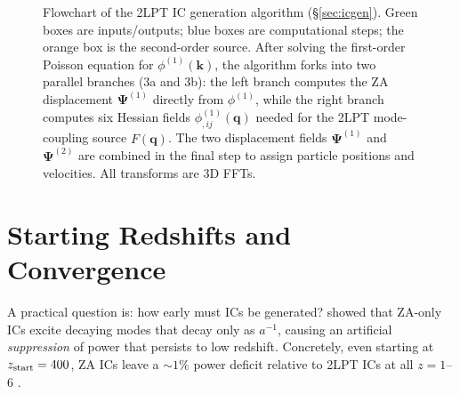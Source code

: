 \documentclass[12pt]{article}
\newcommand{\bq}{\mathbf{q}}
\newcommand{\bk}{\mathbf{k}}
\newcommand{\bPsi}{\boldsymbol{\Psi}}
\begin{document}
\begin{figure}[!t]
\caption{Flowchart of the 2LPT IC generation algorithm
(\S\ref{sec:icgen}).  Green boxes are inputs/outputs; blue boxes are
computational steps; the orange box is the second-order source.
After solving the first-order Poisson equation for $\phi^{(1)}(\bk)$,
the algorithm forks into two parallel branches (3a and 3b):
the left branch computes the ZA displacement $\bPsi^{(1)}$ directly
from $\phi^{(1)}$, while the right branch computes six Hessian fields
$\phi^{(1)}_{,ij}(\bq)$ needed for the 2LPT mode-coupling source $F(\bq)$.
The two displacement fields $\bPsi^{(1)}$ and $\bPsi^{(2)}$ are combined
in the final step to assign particle positions and velocities.
All transforms are 3D FFTs.}
\label{fig:icgen}
\end{figure}

\section{Starting Redshifts and Convergence}
\label{sec:zstart}

A practical question is: how early must ICs be generated?
\citet{Crocce2006} showed that ZA-only ICs excite decaying modes
that decay only as $a^{-1}$, causing an artificial \emph{suppression}
of power that persists to low redshift.  Concretely, even starting at
$z_{\rm start}=400$, ZA ICs leave a $\sim\!1\%$ power deficit relative
to 2LPT ICs at all $z=1$--6 \citep{Jeong2010}.
\end{document}
